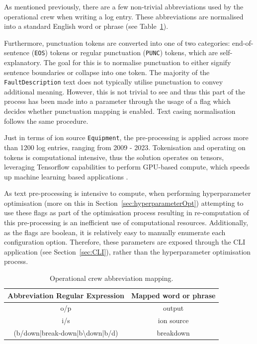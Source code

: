 \documentclass[10pt,oneside]{report}
\begin{document}
As mentioned previously, there are a few non-trivial abbreviations used by the operational crew when writing a log entry. These abbreviations are normalised into a standard English word or phrase (see Table~\ref{tab:abbrevCrew}).

Furthermore, punctuation tokens are converted into one of two categories: end-of-sentence (\texttt{EOS}) tokens or regular punctuation (\texttt{PUNC}) tokens, which are self-explanatory. The goal for this is to normalise punctuation to either signify sentence boundaries or collapse into one token. The majority of the \texttt{FaultDescription} text does not typically utilise punctuation to convey additional meaning. However, this is not trivial to see and thus this part of the process has been made into a parameter through the usage of a flag which decides whether punctuation mapping is enabled. Text casing normalisation follows the same procedure. 

Just in terms of ion source \texttt{Equipment}, the pre-processing is applied across more than 1200 log entries, ranging from 2009 - 2023. Tokenisation and operating on tokens is computational intensive, thus the solution operates on tensors, leveraging Tensorflow capabilities to perform GPU-based compute, which speeds up machine learning based applications \cite{tensorflow2015whitepaper, baldini2014predicting}.

As text pre-processing is intensive to compute, when performing hyperparameter optimisation (more on this in Section~\ref{sec:hyperparameterOpt}) attempting to use these flags as part of the optimisation process resulting in re-computation of this pre-processing is an inefficient use of computational resources. Additionally, as the flags are boolean, it is relatively easy to manually enumerate each configuration option. Therefore, these parameters are exposed through the CLI application (see Section~\ref{sec:CLI}), rather than the hyperparameter optimisation process.


\begin{table}[htbp]
    \fontsize{8}{12}\selectfont
    \centering
    \caption{Operational crew abbreviation mapping.}
    \label{tab:abbrevCrew}
    \begin{adjustbox}{max width=\textwidth}
    \begin{tabular}{c | c}
        \toprule
        \textbf{Abbreviation Regular Expression} & \textbf{Mapped word or phrase} \\
        \midrule
        {o/p} & {output} \\
        {i/s} & {ion source} \\
        {(b/down|break-down|b\textbackslash down|b/d)} & {breakdown} \\
        \bottomrule
    \end{tabular}
    \end{adjustbox}
\end{table}
\end{document}
